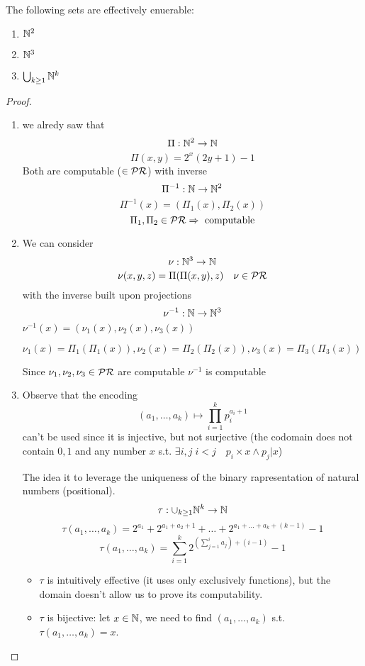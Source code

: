 \begin{lemma}
  The following sets are effectively enuerable:
  \begin{enumerate}[label=(\arabic*)]
  \item $ \mathbb{N}^2 $
  \item $ \mathbb{N}^3 $
  \item $\bigcup_{k\geq 1} \mathbb{N}^k $
  \end{enumerate}
  \begin{proof}
    \begin{enumerate}[label=(\arabic*)]
    \item we alredy saw that \[\Pi : \mathbb{N}^2 \rightarrow
        \mathbb{N}\] \[\Pi(x,y) = 2^x(2y+1)-1\] Both are computable
      ($\in \mathcal{PR}$) with inverse
      \[\Pi^{-1} : \mathbb{N} \rightarrow \mathbb{N}^2\]
      \[\Pi^{-1}(x) = (\Pi_1(x), \Pi_2(x))\]
      \[\Pi_1, \Pi_2 \in \mathcal{PR} \Rightarrow \text{ computable}\]
    \item{
        We can consider \[\nu : \mathbb{N}^3 \rightarrow
          \mathbb{N} \] \[\nu(x,y,z)= \Pi(\Pi(x,y),z) \quad \nu \in \mathcal{PR}\] with
        the inverse built upon projections
        \[\nu^{-1} : \mathbb{N} \rightarrow \mathbb{N}^3\]
        \(\nu^{-1}(x) = (\nu_1(x), \nu_2(x), \nu_3(x))\)

        \(\nu_1(x) = \Pi_1(\Pi_1(x)), \nu_2(x) = \Pi_2(\Pi_2(x)),
        \nu_3(x) = \Pi_3(\Pi_3(x))\)

        Since $\nu_1, \nu_2, \nu_3 \in \mathcal{PR}$ are computable $\nu^{-1}$
        is computable }
    \item{ Observe that the encoding
        \[(a_1, \dots, a_k) \mapsto \prod^k_{i=1}p_i^{a_i+1}\] can't
        be used since it is injective, but not surjective (the
        codomain does not contain $0,1$ and any number $x$
        s.t. \(\exists i,j \; i<j \quad p_i \times x \wedge p_j | x\))

        The idea it to leverage the uniqueness of the binary
        rapresentation of natural numbers (positional).
        \[\tau : \cup_{k \geq 1} \mathbb{N}^k \rightarrow \mathbb{N} \]
        \[\tau (a_1, \dots, a_k ) = 2^{a_1}+2^{a_1+a_2+1}+ \dots + 2^{a_1+\dots + a_k + (k-1)} - 1\]
        \[\tau (a_1, \dots, a_k ) = \sum^k_{i=1}2^{(\sum_{j=1}^i a_j)
            + (i-1)}-1\]
        \begin{itemize}
        \item $\tau$ is intuitively effective (it uses only
          exclusively functions), but the domain doesn't allow us to
          prove its computability.
        \item $\tau$ is bijective: let $x \in \mathbb{N}$, we need to find
          $(a_1, \dots, a_k)$ s.t. $\tau(a_1,\dots,a_k) = x$.
        \end{itemize}
      }
    \end{enumerate}
  \end{proof}
\end{lemma}

